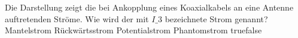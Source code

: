     {Die Darstellung zeigt die bei Ankopplung eines Koaxialkabels an eine Antenne auftretenden Ströme. Wie wird der mit $I\_3$ bezeichnete Strom genannt?}
    {Mantelstrom}
    {Rückwärtsstrom}
    {Potentialstrom}
    {Phantomstrom}
    {true}{false}